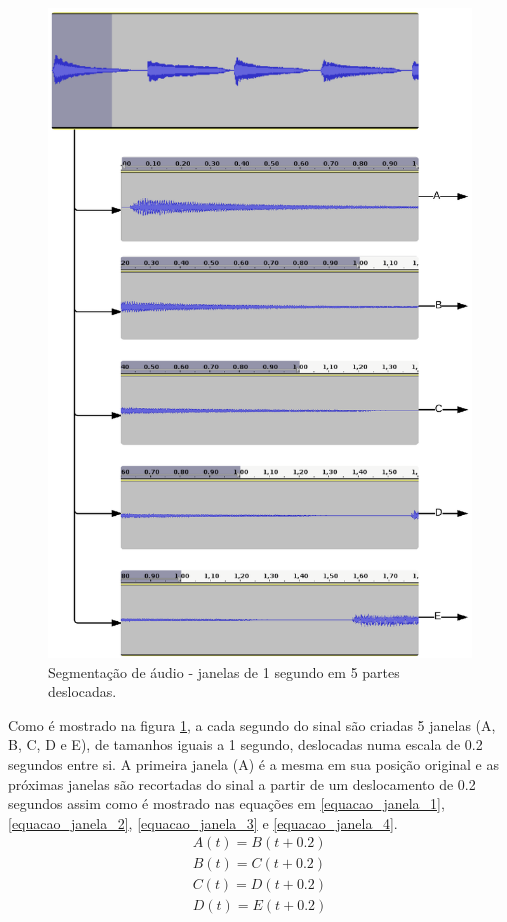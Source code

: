 \begin{figure}[h] 
  \centering
    \includegraphics[keepaspectratio=true, scale=1.1]{figuras/procedimento_1}
    \caption{Segmentação de áudio - janelas de 1 segundo em 5 partes deslocadas.}
    \label{fig:procedimento_1}
\end{figure}

Como é mostrado na figura \ref{fig:procedimento_1}, a cada segundo do sinal são criadas 5 janelas (A, B, C, D e E), de tamanhos iguais a 1 segundo, deslocadas numa escala de 0.2 segundos entre si. A primeira janela (A) é a mesma em sua posição original e as próximas janelas são recortadas do sinal a partir de um deslocamento de 0.2 segundos assim como é mostrado nas equações em \ref{equacao_janela_1}, \ref{equacao_janela_2}, \ref{equacao_janela_3} e \ref{equacao_janela_4}.
\begin{eqnarray}
\label{equacao_janela_1}
	A(t) = B(t + 0.2) \\
	\label{equacao_janela_2}
	B(t) = C(t + 0.2) \\
	\label{equacao_janela_3}
	C(t) = D(t + 0.2) \\
	\label{equacao_janela_4}
	D(t) = E(t + 0.2)
\end{eqnarray}

